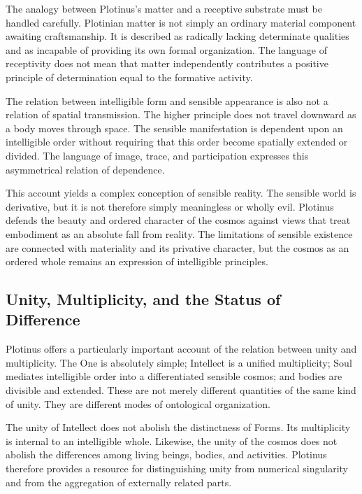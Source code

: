 \label{para:VS.B01.P01.C08.S06.SS06.P003}
The analogy between Plotinus's matter and a receptive substrate
must be handled carefully. Plotinian matter is not simply an
ordinary material component awaiting craftsmanship. It is described
as radically lacking determinate qualities and as incapable of
providing its own formal organization. The language of receptivity
does not mean that matter independently contributes a positive
principle of determination equal to the formative activity.

\label{para:VS.B01.P01.C08.S06.SS06.P004}
The relation between intelligible form and sensible appearance
is also not a relation of spatial transmission. The higher principle
does not travel downward as a body moves through space. The
sensible manifestation is dependent upon an intelligible order
without requiring that this order become spatially extended or
divided. The language of image, trace, and participation expresses
this asymmetrical relation of dependence.

\label{para:VS.B01.P01.C08.S06.SS06.P005}
This account yields a complex conception of sensible reality.
The sensible world is derivative, but it is not therefore simply
meaningless or wholly evil. Plotinus defends the beauty and
ordered character of the cosmos against views that treat embodiment
as an absolute fall from reality. The limitations of sensible
existence are connected with materiality and its privative character,
but the cosmos as an ordered whole remains an expression of
intelligible principles.



\subsection{Unity, Multiplicity, and the Status of Difference}
\label{subsec:ch08-plotinus-unity-difference}

\label{para:VS.B01.P01.C08.S06.SS07.P001}
Plotinus offers a particularly important account of the relation
between unity and multiplicity. The One is absolutely simple;
Intellect is a unified multiplicity; Soul mediates intelligible
order into a differentiated sensible cosmos; and bodies are
divisible and extended. These are not merely different quantities
of the same kind of unity. They are different modes of ontological
organization.

\label{para:VS.B01.P01.C08.S06.SS07.P002}
The unity of Intellect does not abolish the distinctness of Forms.
Its multiplicity is internal to an intelligible whole. Likewise,
the unity of the cosmos does not abolish the differences among
living beings, bodies, and activities. Plotinus therefore provides
a resource for distinguishing unity from numerical singularity
and from the aggregation of externally related parts.

